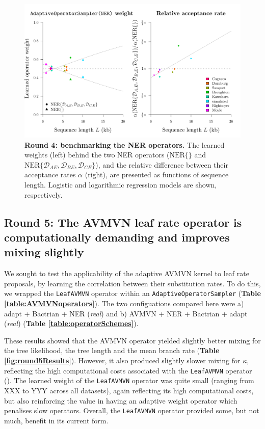 \documentclass[10pt,letterpaper]{article}
\begin{document}
\begin{figure}[!h]
\includegraphics[width=\textwidth]{benchmarking/benchmarkingVM/ESS_round4.pdf}
\caption{\textbf{Round 4: benchmarking the NER operators.} 
The learned weights (left) behind the two NER operators ($\text{NER} \{\}$ and $\text{NER}\{\mathcal{D}_{AE}, \mathcal{D}_{BE}, \mathcal{D}_{CE}\}$), and the relative difference between their acceptance rates $\alpha$ (right), are presented as functions of sequence length.
Logistic and logarithmic regression models are shown, respectively. }
\label{fig:round4Results}
\end{figure}


\subsection*{Round 5: The AVMVN leaf rate operator is computationally demanding and improves mixing slightly}


We sought to test the applicability of the adaptive AVMVN kernel to leaf rate proposals, by learning the correlation between their substitution rates.
To do this, we wrapped the \texttt{LeafAVMVN} operator within an \texttt{AdaptiveOperatorSampler} (\textbf{Table \ref{table:AVMVNoperators}}).
The two configuations compared here were a) adapt + Bactrian + NER (\textit{real}) and b) AVMVN + NER + Bactrian + adapt (\textit{real})  (\textbf{Table \ref{table:operatorSchemes}}).


These results showed that the AVMVN operator yielded slightly better mixing for the tree likelihood, the tree length and the mean branch rate (\textbf{Table \ref{fig:round5Results}}).
However, it also produced slightly slower mixing for $\kappa$, reflecting the high computational costs associated with the \texttt{LeafAVMVN} operator (\textbf{}).
The learned weight of the \texttt{LeafAVMVN} operator was quite small (ranging from XXX to YYY across all datasets), again reflecting its high computational costs, but also reinforcing the value in having an adaptive weight operator which penalises slow operators.
Overall, the \texttt{LeafAVMVN} operator provided some, but not much, benefit in its current form. 
\end{document}

